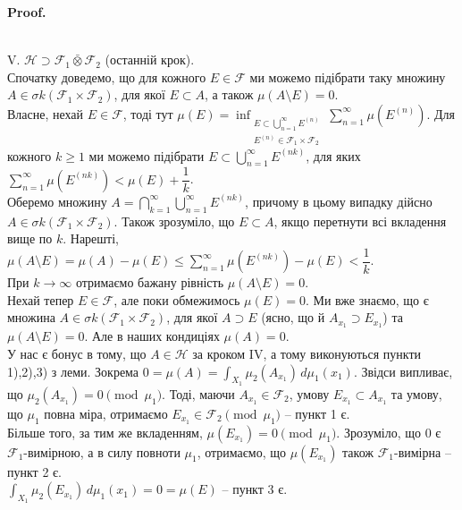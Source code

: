 \documentclass[a4paper, 10pt]{article}
\makeatletter
\theoremstyle{theoremdd}
\renewenvironment{proof}[1][Proof.\\]{\par
\pushQED{\hfill \qed}%
\normalfont \topsep6\p@\@plus6\p@\relax
\trivlist
\item\relax
{\bfseries
#1\@addpunct{.}}\hspace\labelsep\ignorespaces
}{%
\popQED\endtrivlist\@endpefalse
}
\makeatother
\begin{document}
\begin{proof}
\bigskip \\
V. $\mathcal{H} \supset \mathcal{F}_1 \bar{\otimes} \mathcal{F}_2$ (останній крок).\\
Спочатку доведемо, що для кожного $E \in \mathcal{F}$ ми можемо підібрати таку множину $A \in \sigma k(\mathcal{F}_1 \times \mathcal{F}_2)$, для якої $E \subset A$, а також $\mu(A \setminus E) = 0$.\\
Власне, нехай $E \in \mathcal{F}$, тоді тут $\mu(E) = \displaystyle\inf_{\substack{E \subset \bigcup_{n=1}^\infty E^{(n)} \\ E^{(n)} \in \mathcal{F}_1 \times \mathcal{F}_2}} \sum_{n=1}^\infty \mu\left(E^{(n)}\right)$. Для кожного $k \geq 1$ ми можемо підібрати $E \subset \displaystyle\bigcup_{n=1}^\infty E^{(nk)}$, для яких $\displaystyle\sum_{n=1}^\infty \mu\left( E^{(nk)} \right) < \mu(E) + \dfrac{1}{k}$.\\
Оберемо множину $A = \displaystyle\bigcap_{k=1}^\infty \bigcup_{n=1}^\infty E^{(nk)}$, причому в цьому випадку дійсно $A \in \sigma k(\mathcal{F}_1 \times \mathcal{F}_2)$. Також зрозуміло, що $E \subset A$, якщо перетнути всі вкладення вище по $k$. Нарешті,\\
$\displaystyle\mu\left( A \setminus E \right) = \mu(A) - \mu(E) \leq \sum_{n=1}^\infty \mu\left( E^{(nk)} \right) - \mu(E) < \dfrac{1}{k}$.\\
При $k \to \infty$ отримаємо бажану рівність $\mu(A \setminus E) = 0$.
\bigskip \\
Нехай тепер $E \in \mathcal{F}$, але поки обмежимось $\mu(E) = 0$. Ми вже знаємо, що є множина $A \in \sigma k(\mathcal{F}_1 \times \mathcal{F}_2)$, для якої $A \supset E$ (ясно, що й $A_{x_1} \supset E_{x_1}$) та $\mu(A \setminus E) = 0$. Але в наших кондиціях $\mu(A) = 0$.\\
У нас є бонус в тому, що $A \in \mathcal{H}$ за кроком IV, а тому виконуються пункти 1),2),3) з леми. Зокрема $0 = \mu(A) = \displaystyle\int_{X_1} \mu_2(A_{x_1})\,d\mu_1(x_1)$. Звідси випливає, що $\mu_2(A_{x_1}) = 0 \pmod {\mu_1}$. Тоді, маючи $A_{x_1} \in \mathcal{F}_2$, умову $E_{x_1} \subset A_{x_1}$ та умову, що $\mu_1$ повна міра, отримаємо $E_{x_1} \in \mathcal{F}_2 \pmod {\mu_1}$ -- пункт 1 є.\\
Більше того, за тим же вкладенням, $\mu(E_{x_1}) = 0 \pmod {\mu_1}$. Зрозуміло, що $0$ є $\mathcal{F}_1$-вимірною, а в силу повноти $\mu_1$, отримаємо, що $\mu(E_{x_1})$ також $\mathcal{F}_1$-вимірна -- пункт 2 є.\\
$\displaystyle\int_{X_1} \mu_2\left(E_{x_1}\right)\,d\mu_1(x_1) = 0 = \mu(E)$ -- пункт 3 є.

\end{proof}
\end{document}
